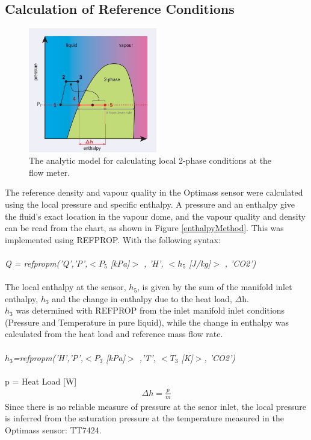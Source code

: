 \documentclass{report}
\begin{document}
\subsection{Calculation of Reference Conditions}
\FloatBarrier
\begin{figure}
\includegraphics[width=0.5\textwidth]{enthalpyMethod.jpg}
\caption{The analytic model for calculating local 2-phase conditions at the flow meter.}
\label{fig:enthalpyMethod}
\end{figure}
The reference density and vapour quality in the Optimass sensor were calculated using the local pressure and specific enthalpy. A pressure and an enthalpy give the fluid's exact location in the vapour dome, and the vapour quality and density can be read from the chart, as shown in Figure \ref{enthalpyMethod}. This was implemented using REFPROP. With the following syntax: \\\\
\textit{Q = refpropm('Q','P',$<P_5$ [kPa]$>$ , 'H', $<h_5$ [J/kg]$>$ , 'CO2')} \\\\
The local enthalpy at the sensor, \textit{$h_5$}, is given by the sum of the manifold inlet enthalpy, $h_3$ and the change in enthalpy due to the heat load, $\Delta$h.\\
\textit{$h_3$} was determined with REFPROP from the inlet manifold inlet conditions (Pressure and Temperature in pure liquid), while the change in enthalpy was calculated from the heat load and reference mass flow rate.\\\\
\textit{$h_3$=refpropm('H','P',$<P_3$ [kPa]$>$ ,'T', $<T_3$ [K]$>$, 'CO2')}\\\\
p = Heat Load [W]\\
\begin{eqnarray}
\Delta h=\frac{p}{\dot{m}}
\end{eqnarray}
\FloatBarrier
Since there is no reliable measure of pressure at the senor inlet, the local pressure is inferred from the saturation pressure at the temperature measured in the Optimass sensor: TT7424.
\end{document}
